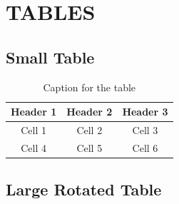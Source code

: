 \documentclass[a4paper,12pt]{article}
\begin{document}
\section{TABLES}

\subsection{Small Table}

\lipsum[1]

\begin{table}[htbp]
    \centering
    \caption{Caption for the table}
    \begin{tabular}{ccc}
        \toprule
        Header 1 & Header 2 & Header 3 \\
        \midrule
        Cell 1 & Cell 2 & Cell 3 \\
        Cell 4 & Cell 5 & Cell 6 \\
        \bottomrule
    \end{tabular}
    \label{tab:mytable}
\end{table}

\subsection{Large Rotated Table}

\lipsum[1]
\end{document}
